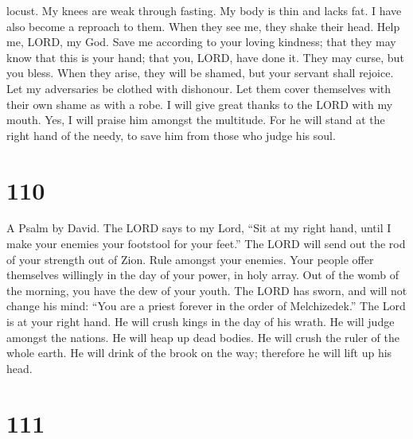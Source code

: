 locust.  My knees are weak through fasting. My body is thin
and lacks fat.  I have also become a reproach to them. When
they see me, they shake their head.  Help me, LORD, my God.
Save me according to your loving kindness;  that they may
know that this is your hand; that you, LORD, have done it. 
They may curse, but you bless. When they arise, they will be shamed, but
your servant shall rejoice.  Let my adversaries be clothed
with dishonour. Let them cover themselves with their own shame as with a
robe.  I will give great thanks to the LORD with my mouth.
Yes, I will praise him amongst the multitude.  For he will
stand at the right hand of the needy, to save him from those who judge
his soul.

\hypertarget{section-102}{%
\section{110}\label{section-102}}

A Psalm by David.  The LORD says to my Lord, ``Sit at my
right hand, until I make your enemies your footstool for your feet.''
 The LORD will send out the rod of your strength out of
Zion. Rule amongst your enemies.  Your people offer
themselves willingly in the day of your power, in holy array. Out of the
womb of the morning, you have the dew of your youth.  The
LORD has sworn, and will not change his mind: ``You are a priest forever
in the order of Melchizedek.''  The Lord is at your right
hand. He will crush kings in the day of his wrath.  He will
judge amongst the nations. He will heap up dead bodies. He will crush
the ruler of the whole earth.  He will drink of the brook on
the way; therefore he will lift up his head.

\hypertarget{section-103}{%
\section{111}\label{section-103}}

